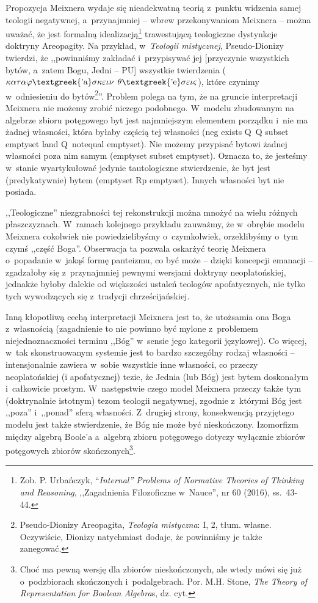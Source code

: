 Propozycja Meixnera wydaje się nieadekwatną teorią z~punktu widzenia samej teologii negatywnej, a~przynajmniej -- wbrew przekonywaniom Meixnera -- można uważać, że jest formalną idealizacją\footnote{ Zob. P. Urbańczyk, ``\textit{Internal'' Problems of Normative Theories of Thinking and Reasoning}, ,,Zagadnienia Filozoficzne w~Nauce'', nr 60 (2016), ss.~43-44.} trawestującą teologiczne dystynkcje doktryny Areopagity. Na przykład, w~\textit{Teologii mistycznej}, Pseudo-Dionizy twierdzi, że ,,powinniśmy zakładać i~przypisywać jej [przyczynie wszystkich bytów, a~zatem Bogu, Jedni -- PU] wszystkie twierdzenia ($\kappa \alpha \tau \alpha \varphi \text{\textgreek{'a}}\sigma \kappa \varepsilon \iota \nu $ $\theta \text{\textgreek{'e}}\sigma \varepsilon \iota \varsigma $), które czynimy w~odniesieniu do bytów\footnote{ Pseudo-Dionizy Areopagita, \textit{Teologia mistyczna}: I, 2, tłum. własne. Oczywiście, Dionizy natychmiast dodaje, że powinniśmy je także zanegować.}''. Problem polega na tym, że na gruncie interpretacji Meixnera nie możemy zrobić niczego podobnego. W~modelu zbudowanym na algebrze zbioru potęgowego byt jest najmniejszym elementem porządku i~nie ma żadnej własności, która byłaby częścią tej własności (neg exists Q~Q subset emptyset land Q~notequal emptyset). Nie możemy przypisać bytowi żadnej własności poza nim samym (emptyset subset emptyset). Oznacza to, że jesteśmy w~stanie wyartykułować jedynie tautologiczne stwierdzenie, że byt jest (predykatywnie) bytem (emptyset Rp emptyset). Innych własności byt nie posiada.

,,Teologiczne'' niezgrabności tej rekonstrukcji można mnożyć na wielu różnych płaszczyznach. W~ramach kolejnego przykładu zauważmy, że w~obrębie modelu Meixnera cokolwiek nie powiedzielibyśmy o~czymkolwiek, orzeklibyśmy o~tym czymś ,,część Boga''. Obserwacja ta pozwala oskarżyć teorię Meixnera o~popadanie w~jakąś formę panteizmu, co być może -- dzięki koncepcji emanacji -- zgadzałoby się z~przynajmniej pewnymi wersjami doktryny neoplatońskiej, jednakże byłoby dalekie od większości ustaleń teologów apofatycznych, nie tylko tych wywodzących się z~tradycji chrześcijańskiej.

Inną kłopotliwą cechą interpretacji Meixnera jest to, że utożsamia ona Boga z~własnością (zagadnienie to nie powinno być mylone z~problemem niejednoznaczności terminu ,,Bóg'' w~sensie jego kategorii językowej). Co więcej, w~tak skonstruowanym systemie jest to bardzo szczególny rodzaj własności -- intensjonalnie zawiera w~sobie wszystkie inne własności, co przeczy neoplatońskiej (i apofatycznej) tezie, że Jednia (lub Bóg) jest bytem doskonałym i~całkowicie prostym. W~następstwie czego model Meixnera przeczy także tym (doktrynalnie istotnym) tezom teologii negatywnej, zgodnie z~którymi Bóg jest ,,poza'' i~,,ponad'' sferą własności. Z~drugiej strony, konsekwencją przyjętego modelu jest także stwierdzenie, że Bóg nie może być nieskończony. Izomorfizm między algebrą Boole'a a~algebrą zbioru potęgowego dotyczy wyłącznie zbiorów potęgowych zbiorów skończonych\footnote{ Choć ma pewną wersję dla zbiorów nieskończonych, ale wtedy mówi się już o~podzbiorach skończonych i~podalgebrach. Por. M.H. Stone, \textit{The Theory of Representation for Boolean Algebra}s, dz. cyt.}.

